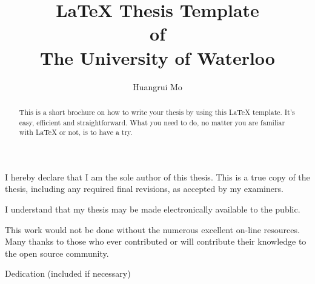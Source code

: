 \title[\LaTeX{} Thesis Template of UW]{\LaTeX{} Thesis Template\\ of\\ The University of Waterloo}%
\author{Huangrui Mo}
\maketitle
\begin{declaration}
    \noindent
    I hereby declare that I am the sole author of this thesis. This is a true copy of the thesis, including any required final revisions, as accepted by my examiners.

    \bigskip

    \noindent
    I understand that my thesis may be made electronically available to the public.
\end{declaration}
\begin{abstract}
    This is a short brochure on how to write your thesis by using this \LaTeX{} template. It's easy, efficient and straightforward. What you need to do, no matter you are familiar with \LaTeX{} or not, is to have a try. 
\end{abstract}
\begin{acknowledgements}
    This work would not be done without the numerous excellent on-line resources. Many thanks to those who ever contributed or will contribute their knowledge to the open source community.
\end{acknowledgements}
\begin{dedication}
    Dedication (included if necessary)
\end{dedication}

